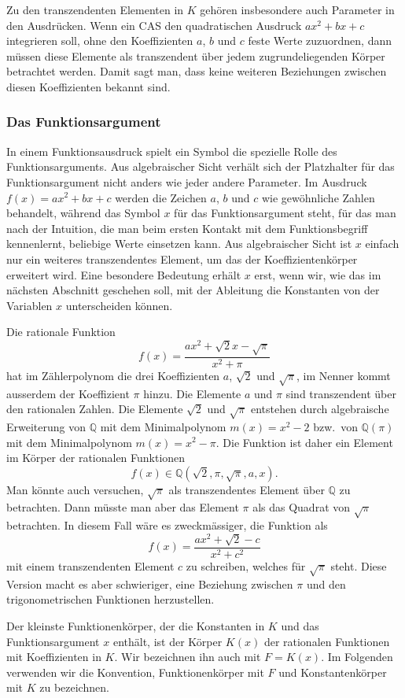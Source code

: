 Zu den transzendenten Elementen in $K$ gehören insbesondere auch
Parameter in den Ausdrücken.
Wenn ein CAS den quadratischen Ausdruck $ax^2+bx+c$ integrieren soll,
ohne den Koeffizienten $a$, $b$ und $c$ feste Werte zuzuordnen, dann
müssen diese Elemente als transzendent über jedem zugrundeliegenden
Körper betrachtet werden.
Damit sagt man, dass keine weiteren Beziehungen zwischen diesen
Koeffizienten bekannt sind.

%
%
\subsubsection{Das Funktionsargument}
In einem Funktionsausdruck spielt ein Symbol die spezielle Rolle
des Funktionsarguments.
Aus algebraischer Sicht verhält sich der Platzhalter für das
Funktionsargument nicht anders wie jeder andere Parameter.
Im Ausdruck $f(x) = ax^2 + bx + c$ werden die Zeichen $a$, $b$ und $c$
wie gewöhnliche Zahlen behandelt, während das Symbol $x$ für das
Funktionsargument steht, für das man nach der Intuition, die man
beim ersten Kontakt mit dem Funktionsbegriff kennenlernt, beliebige
Werte einsetzen kann.
Aus algebraischer Sicht ist $x$ einfach nur ein weiteres transzendentes
Element, um das der Koeffizientenkörper erweitert wird.
Eine besondere Bedeutung erhält $x$ erst, wenn wir, wie das im
nächsten Abschnitt geschehen soll, mit der Ableitung die Konstanten
von der Variablen $x$ unterscheiden können.

\begin{beispiel}
Die rationale Funktion
\[
f(x) 
=
\frac{ax^2 + \!\sqrt{2}x - \sqrt{\pi}}{x^2+\pi}
\]
hat im Zählerpolynom die drei Koeffizienten $a$, $\!\sqrt{2}$ und
$\!\sqrt{\pi}$, im Nenner kommt ausserdem der Koeffizient $\pi$ hinzu.
Die Elemente $a$ und $\pi$ sind transzendent über den rationalen
Zahlen.
Die Elemente
$\!\sqrt{2}$
und
$\!\sqrt{\pi}$
entstehen
durch algebraische Erweiterung von $\mathbb{Q}$ mit dem
Minimalpolynom $m(x)=x^2-2$ bzw.~von $\mathbb{Q}(\pi)$ mit
dem Minimalpolynom $m(x)=x^2-\pi$.
Die Funktion ist daher ein Element im Körper der rationalen
Funktionen
\[
f(x)
\in
\mathbb{Q}(\!\sqrt{2},\pi,\!\sqrt{\pi},a,x).
\]
Man könnte auch versuchen, $\!\sqrt{\pi}$ als transzendentes Element
über $\mathbb{Q}$ zu betrachten.
Dann müsste man aber das Element $\pi$ als das Quadrat von $\!\sqrt{\pi}$
betrachten.
In diesem Fall wäre es zweckmässiger, die Funktion als
\[
f(x)
=
\frac{ax^2+\!\sqrt{2}-c}{x^2+c^2}
\]
mit einem transzendenten Element $c$ zu schreiben, welches für
$\sqrt{\pi}$ steht.
Diese Version macht es aber schwieriger, eine Beziehung zwischen $\pi$ 
und den trigonometrischen Funktionen herzustellen.
\end{beispiel}

Der kleinste Funktionenkörper, der die Konstanten in $K$ und das
Funktionsargument $x$ enthält, ist der Körper $K(x)$ der rationalen
Funktionen mit Koeffizienten in $K$.
Wir bezeichnen ihn auch mit $F=K(x)$.
Im Folgenden verwenden wir die Konvention, Funktionenkörper mit $F$
und Konstantenkörper mit $K$ zu bezeichnen.

